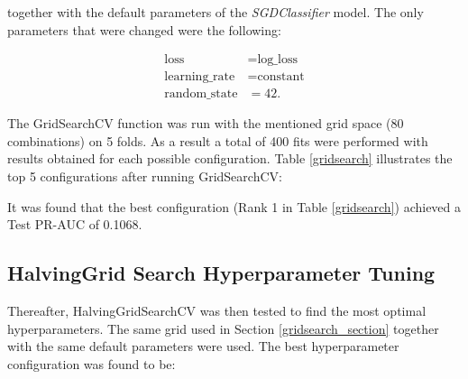 together with the default parameters of the \emph{SGDClassifier} model. The only parameters that were changed were the following:

\[
\begin{aligned}
\text{loss} &= \text{log\_loss} \\
\text{learning\_rate} &= \text{constant} \\
\text{random\_state} &= 42.
\end{aligned}
\]

The GridSearchCV function was run with the mentioned grid space (80 combinations) on 5 folds. As a result a total of 400 fits were performed with results obtained for each possible configuration.
Table \ref{gridsearch} illustrates the top 5 configurations after running GridSearchCV:

\begin{table}[htbp]
\caption{Top-5 GridSearchCV Results}
\centering
{}
\label{gridsearch}
\end{table}

It was found that the best configuration (Rank 1 in Table \ref{gridsearch}) achieved a Test PR-AUC of 0.1068.

\subsection{HalvingGrid Search Hyperparameter Tuning}\label{halvinggridsearch_section}

Thereafter, HalvingGridSearchCV was then tested to find the most optimal hyperparameters. The same grid used in Section \ref{gridsearch_section} together with the same default parameters were used.
The best hyperparameter configuration was found to be:

